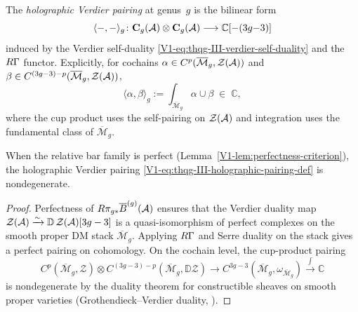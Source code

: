 \begin{definition}
\label{def:thqg-III-holographic-pairing}
The \emph{holographic Verdier pairing} at genus~$g$ is the
bilinear form
\begin{equation}%
\langle -, - \rangle_g
\colon
\mathbf{C}_g(\cA) \otimes \mathbf{C}_g(\cA)
\longrightarrow
\mathbb{C}[{-(3g{-}3)}]
\end{equation}
induced by the Verdier self-duality
\eqref{V1-eq:thqg-III-verdier-self-duality} and the $R\Gamma$
functor. Explicitly, for cochains
$\alpha \in C^p(\overline{\mathcal{M}}_g, \mathcal{Z}(\mathcal{A}))$
and
$\beta \in C^{(3g-3)-p}(\overline{\mathcal{M}}_g,
\mathcal{Z}(\mathcal{A}))$,
\begin{equation}%
\langle \alpha, \beta \rangle_g
:=
\int_{\overline{\mathcal{M}}_g}
\alpha \cup \beta
\;\in\; \mathbb{C},
\end{equation}
where the cup product uses the self-pairing on
$\mathcal{Z}(\mathcal{A})$ and integration uses the fundamental class
of $\overline{\mathcal{M}}_g$.
\end{definition}

\begin{lemma}
\label{lem:thqg-III-nondegeneracy}
When the relative bar family is perfect
\textup{(}Lemma~\textup{\ref{V1-lem:perfectness-criterion})},
the holographic Verdier pairing
\eqref{V1-eq:thqg-III-holographic-pairing-def} is nondegenerate.
\end{lemma}

\begin{proof}
Perfectness of $R\pi_{g*}\overline{B}^{(g)}(\mathcal{A})$ ensures that
the Verdier duality map
$\mathcal{Z}(\mathcal{A}) \xrightarrow{\sim}
\mathbb{D}\,\mathcal{Z}(\mathcal{A})[3g - 3]$
is a quasi-isomorphism of perfect complexes on the smooth
proper DM stack $\overline{\mathcal{M}}_g$. Applying $R\Gamma$
and Serre duality on the stack gives a perfect pairing on
cohomology. On the cochain level, the cup-product pairing
\[
C^p(\overline{\mathcal{M}}_g, \mathcal{Z})
\otimes
C^{(3g-3)-p}(\overline{\mathcal{M}}_g, \mathbb{D}\mathcal{Z})
\to
C^{3g-3}(\overline{\mathcal{M}}_g, \omega_{\overline{\mathcal{M}}_g})
\xrightarrow{\int}
\mathbb{C}
\]
is nondegenerate by the duality theorem for constructible sheaves
on smooth proper varieties
(Grothendieck--Verdier duality, \cite[Theorem~3.1.10]{KS90}).
\end{proof}

